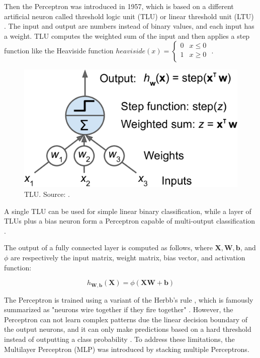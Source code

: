 \documentclass[a4paper, 11pt, oneside]{article}
\begin{document}
  Then the Perceptron was introduced in 1957, which is based on a different artificial neuron called threshold logic unit
  (TLU) or linear threshold unit (LTU) \cite{rosenblatt1957perceptron}. The input and output are numbers instead of
  binary values, and each input has a weight. TLU computes the weighted sum of the input and then applies a step
  function like the Heaviside function
  $heaviside (x) =
  \begin{cases}
    0 & x \le 0 \\
    1 & x \geq 0 \\
  \end{cases}$
  \cite{geron2019hands, rosenblatt1957perceptron}.

  \begin{figure}[ht]
    \begin{center}
      \includegraphics[width=.5\textwidth]{tlu.png}
    \end{center}
    \caption{TLU. Source: \cite{geron2019hands}.}
  \end{figure}

  A single TLU can be used for simple linear binary classification, while a layer of TLUs plus a bias neuron form a
  Perceptron capable of multi-output classification \cite{geron2019hands}.

  The output of a fully connected layer is computed as follows, where $\mathbf{X}, \mathbf{W}, \mathbf{b}$, and $\phi$
  are respectively the input matrix, weight matrix, bias vector, and activation function:

  $$h_{\mathbf{W,b}}(\mathbf{X}) = \phi(\mathbf{XW} + \mathbf{b})$$

  The Perceptron is trained using a variant of the Herbb's rule \cite{hebb2005organization}, which is famously summarized
  as "neurons wire together if they fire together" \cite{lowel1992selection}. However, the Perceptron
  can not learn complex patterns due the linear decision boundary of the output neurons, and it can only make predictions
  based on a hard threshold instead of outputting a class probability \cite{geron2019hands}. To address these limitations,
  the Multilayer Perceptron (MLP) was introduced by stacking multiple Perceptrons.
\end{document}
